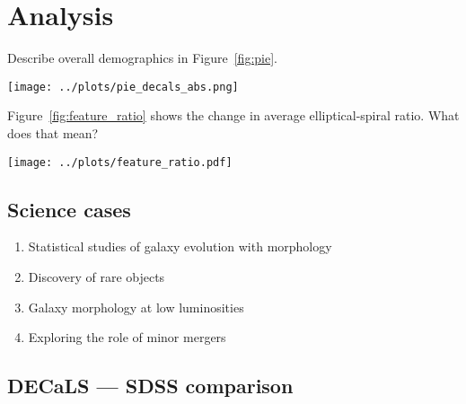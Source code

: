 \documentclass[iop,apj,tighten]{emulateapj}
\begin{document}
\section{Analysis}

Describe overall demographics in Figure~\ref{fig:pie}.

\begin{figure*}
\centering
\texttt{[image: ../plots/pie\_decals\_abs.png]}
\caption{Distribution of the plurality morphological category for each task in GZ:DECaLS. Labels show the count of the number of galaxies with each morphology, including only those for which the question was reached in the hierarchical tree.\label{fig:pie}}
\end{figure*}

Figure~\ref{fig:feature_ratio} shows the change in average elliptical-spiral ratio. What does that mean?

\begin{figure*}
\centering
\texttt{[image: ../plots/feature\_ratio.pdf]}
\caption{Average spiral-elliptical ratio for various galaxy samples as a function of optical $(u-r)$ color. From left to right, curves are for the GZ2 main spectroscopic sample, the deeper Stripe~82 coadded images, and the DECaLS images. Colors/linestyles show different volume/absolute magnitude limits for each sample.\label{fig:feature_ratio}}
\end{figure*}

\subsection{Science cases}

\begin{enumerate}

\item Statistical studies of galaxy evolution with morphology

\item Discovery of rare objects

\item Galaxy morphology at low luminosities

\item Exploring the role of minor mergers

\end{enumerate}

\subsection{DECaLS --- SDSS comparison}
\end{document}
